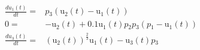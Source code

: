 \begin{align}
\frac{du{_1}(t)}{dt} =& p{_3} \left( \mathrm{u{_2}}\left( t \right) - \mathrm{u{_1}}\left( t \right) \right) \\
0 =&  - \mathrm{u{_2}}\left( t \right) + 0.1 \mathrm{u{_1}}\left( t \right) p{_2} p{_3} \left( p{_1} - \mathrm{u{_1}}\left( t \right) \right) \\
\frac{du{_3}(t)}{dt} =& \left( \mathrm{u{_2}}\left( t \right) \right)^{\frac{2}{3}} \mathrm{u{_1}}\left( t \right) - \mathrm{u{_3}}\left( t \right) p{_3}
\end{align}
